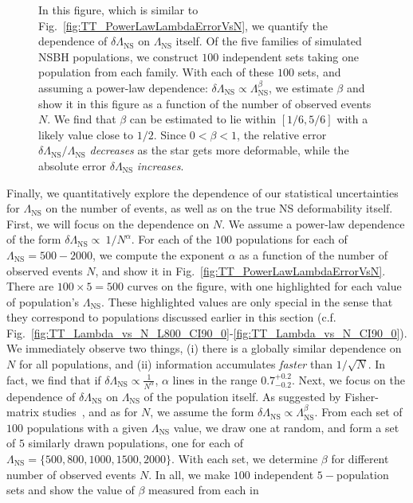 \documentclass[aps,prd,amsmath,floats,floatfix, twocolumn,
superscriptaddress,nofootinbib,showpacs]{revtex4-1}
\newcommand{\lambdans}{\Lambda_\mathrm{NS}}
\begin{document}
\begin{appendix}
\begin{figure}
\caption{%
In this figure, which is similar to Fig.~\ref{fig:TT_PowerLawLambdaErrorVsN},
we quantify the dependence of $\delta\lambdans$ on $\lambdans$ itself. Of 
the five families of simulated NSBH populations, we construct $100$
independent sets taking one population from each family. With each of 
these $100$ sets, and assuming a power-law dependence:
$\delta\lambdans\propto\lambdans^\beta$, we estimate $\beta$ and show it in
this figure as a function of the number of observed events $N$.
% 
We find that $\beta$ can be estimated to lie within $[1/6,5/6]$ with a
likely value close to $1/2$. Since $0<\beta<1$, the relative error
$\delta\lambdans/\lambdans$ {\it decreases} as the star gets more 
deformable, while the absolute error $\delta\lambdans$ {\it increases}.
}
\label{fig:TT_PowerLawLambdaErrorVsLambda}
\end{figure}
% 
Finally, we quantitatively explore the dependence of our statistical
uncertainties for $\lambdans$ on the number of events, as well as on the true
NS deformability itself. First, we will focus on the dependence on $N$. We
assume a power-law dependence of the form
$\delta\lambdans\propto\ 1/N^\alpha$. For each of the $100$ populations 
for each of $\lambdans=500-2000$, we compute the exponent $\alpha$ as a
function of the number of observed events $N$, and show it in 
Fig.~\ref{fig:TT_PowerLawLambdaErrorVsN}. There are $100\times5=500$ curves
on the figure, with one highlighted for each value of population's $\lambdans$.
These highlighted values are only special in the sense that they correspond to
populations discussed earlier in this section (c.f.
Fig.~\ref{fig:TT_Lambda_vs_N_L800_CI90_0}-\ref{fig:TT_Lambda_vs_N_CI90_0}).
We immediately observe two things, (i) there is a globally similar dependence
on $N$ for all populations, and (ii) information accumulates {\it faster} than
$1/\sqrt{N}$. In fact, we find that if
$\delta\lambdans\propto\frac{1}{N^\alpha}$, $\alpha$ lines in the range
$0.7_{-0.2}^{+0.2}$.
% 
Next, we focus on the dependence of $\delta\lambdans$ on $\lambdans$ of the
population itself. As suggested by Fisher-matrix studies~\cite{Lackey:2013axa},
and as for $N$, we assume the form $\delta\lambdans\propto\lambdans^\beta$.
From each set of $100$ populations with a given $\lambdans$ value, we draw one
at random, and form a set of $5$ similarly drawn populations, one for each of
$\lambdans=\{500,800,1000,1500,2000\}$. With each set, we determine $\beta$
for different number of observed events $N$. In all, we make $100$ independent
$5-$population sets and show the value of $\beta$ measured from each in 

\end{appendix}
\end{document}
